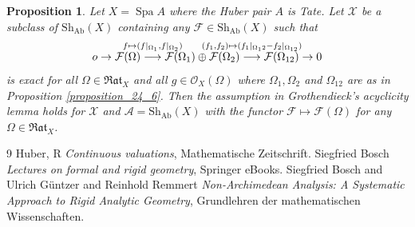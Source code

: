 \documentclass[8pt]{article}
\numberwithin{equation}{section}
\newtheorem{proposition}{Proposition}[subsection]
\DeclareMathOperator{\Spa}{Spa}
\newcommand{\cF}[0]{\mathcal{F}}
\newcommand{\Rat}[0]{\mathfrak{Rat}}
\begin{document}
\begin{proposition}
    \label{proposition_24_7}
    Let $X=\Spa A$ where the Huber pair $A$ is Tate. %
    Let $\mathscr{X}$ be a subclass of $\mathrm{Sh}_{\mathrm{Ab}}(X)$ containing any $\cF\in\mathrm{Sh}_{\mathrm{Ab}}(X)$ such that
    \begin{equation*}
        o\to\mathcal{F}(\Omega)\stackrel{\substack{\mathmakebox[0pt][c]{f\mapsto(f|_{\Omega_1},f|_{\Omega_2})}\\\:}}{\longrightarrow}\mathcal{F}(\Omega_1)\oplus\mathcal{F}(\Omega_2)\stackrel{\substack{\mathmakebox[0pt][c]{(f_1,f_2)\mapsto(f_1|_{\Omega_12}-f_2|_{\Omega_{12}})}\\\:}}{\longrightarrow}\mathcal{F}(\Omega_{12})\to 0
    \end{equation*}
    is exact for all $\Omega\in\Rat_X$ and all $g\in\mathcal{O}_X(\Omega)$ where $\Omega_1,\Omega_2$ and $\Omega_{12}$ are as in Proposition \ref{proposition_24_6}. Then the assumption in Grothendieck's acyclicity lemma holds for $\mathscr{X}$ and $\mathscr{A}=\mathrm{Sh}_{\mathrm{Ab}}(X)$ with the functor $\cF\mapsto \cF(\Omega)$ for any $\Omega\in\Rat_X$.
\end{proposition}

\begin{thebibliography}{9}
Huber, R \emph{Continuous valuations}, Mathematische Zeitschrift.
Siegfried Bosch \emph{Lectures on formal and rigid geometry}, Springer eBooks.
 Siegfried Bosch and Ulrich Güntzer and Reinhold Remmert \emph{Non-Archimedean Analysis: A Systematic Approach to Rigid Analytic Geometry}, Grundlehren der mathematischen Wissenschaften.
\end{thebibliography}
\end{document}
